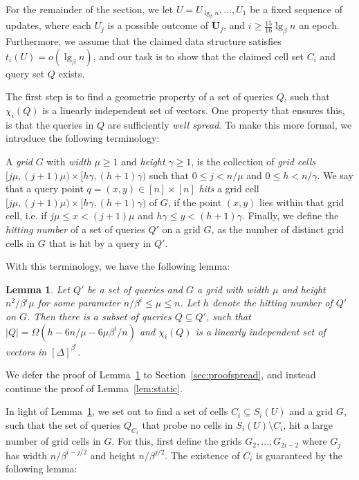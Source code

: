 \documentclass[letterpaper]{article}
\newtheorem{lemma}{Lemma}
\newcommand{\U}{\textbf{U}}
\newcommand{\inc}[1]{\chi_{#1}}
\begin{document}
For the remainder of the section, we let $U=U_{\lg_\beta n},\dots,U_1$
be a fixed sequence of updates, where each $U_j$ is a possible outcome
of $\U_j$, and $i \geq \tfrac{15}{16}\lg_\beta n$ an epoch. Furthermore,
we assume that the claimed data structure satisfies
$t_i(U)=o(\lg_\beta n)$, and our task is to show that the claimed cell
set $C_i$ and query set $Q$ exists.

The first step is to find a geometric property of a set of queries
$Q$, such that $\inc{i}(Q)$ is a linearly independent set of
vectors. One property that ensures this, is that the queries in $Q$
are sufficiently \emph{well spread}. To make this more formal, we
introduce the following terminology:

A \emph{grid} $G$ with \emph{width} $\mu \geq 1$ and \emph{height}
$\gamma \geq 1$, is the collection of \emph{grid cells} $[j
  \mu,(j+1)\mu) \times[h\gamma,(h+1)\gamma)$ such that $0 \leq j <
    n/\mu$ and $0\leq h < n/\gamma$. We say that a query point
    $q=(x,y) \in [n] \times [n]$ \emph{hits} a grid cell $[j
      \mu,(j+1)\mu) \times[h\gamma,(h+1)\gamma)$ of $G$, if the point
        $(x,y)$ lies within that grid cell, i.e. if $j\mu \leq x <
        (j+1)\mu$ and $h \gamma \leq y < (h+1)\gamma$. Finally, we
        define the \emph{hitting number} of a set of queries $Q'$ on a
        grid $G$, as the number of distinct grid cells in $G$ that is
        hit by a query in $Q'$.

With this terminology, we have the following lemma:

\begin{lemma}
\label{lem:spread}
Let $Q'$ be a set of queries and $G$ a grid with width $\mu$ and
height $n^2/\beta^i \mu$ for some parameter $n/\beta^i \leq \mu \leq
n$. Let $h$ denote the hitting number of $Q'$ on $G$. Then there is a
subset of queries $Q \subseteq Q'$, such that $|Q| =
\Omega(h-6n/\mu-6\mu\beta^i/n)$ and $\inc{i}(Q)$ is a linearly
independent set of vectors in $[\Delta]^{\beta^i}$.
\end{lemma}

We defer the proof of Lemma~\ref{lem:spread} to
Section~\ref{sec:proofspread}, and instead continue the proof of
Lemma~\ref{lem:static}.

In light of Lemma~\ref{lem:spread}, we set out to find a set of cells
$C_i \subseteq S_i(U)$ and a grid $G$, such that the set of queries
$Q_{C_i}$ that probe no cells in $S_i(U) \setminus C_i$, hit a large
number of grid cells in $G$. For this, first define the grids
$G_2,\dots,G_{2i-2}$ where $G_j$ has width $n/\beta^{i-j/2}$ and
height $n/\beta^{j/2}$.  The existence of $C_i$ is guaranteed by the
following lemma:
\end{document}
